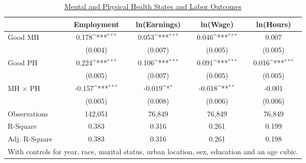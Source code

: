 \def\sym#1{\ifmmode^{#1}\else\(^{#1}\)\fi}
\begin{table}
\center\caption*{\large{\underline{Mental and Physical Health States and Labor Outcomes}}}
\vspace{0.2cm}
\begin{tabular}{l*{4}{c}}
                    &\multicolumn{1}{c}{Employment}&\multicolumn{1}{c}{ln(Earnings)}&\multicolumn{1}{c}{ln(Wage)}&\multicolumn{1}{c}{ln(Hours)}\\
\midrule
Good MH             &       0.178\sym{***}&       0.053\sym{***}&       0.046\sym{***}&       0.007         \\
                    &     (0.004)         &     (0.007)         &     (0.005)         &     (0.005)         \\
Good PH             &       0.224\sym{***}&       0.106\sym{***}&       0.091\sym{***}&       0.016\sym{***}\\
                    &     (0.005)         &     (0.007)         &     (0.005)         &     (0.005)         \\
MH $\times$ PH      &      -0.157\sym{***}&      -0.019\sym{*}  &      -0.018\sym{**} &      -0.001         \\
                    &     (0.005)         &     (0.008)         &     (0.006)         &     (0.006)         \\
\midrule
Observations        &      142,051         &       76,849         &       76,849         &       76,849         \\
R-Square            &       0.383         &       0.316         &       0.261         &       0.199         \\
Adj. R-Square       &       0.383         &       0.316         &       0.261         &       0.198         \\
\bottomrule
\multicolumn{5}{l}{\scriptsize{With controls for year, race, marital status, urban location, sex, education and an age cubic.}} \\
\end{tabular}
\end{table}
